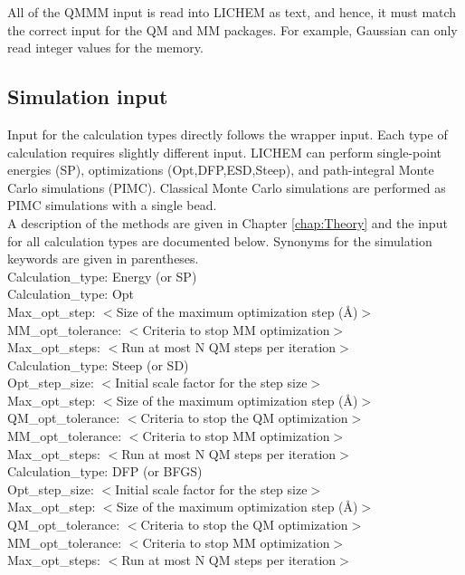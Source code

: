 \documentclass[12pt]{report}
\begin{document}
All of the QMMM input is read into LICHEM as text, and hence, it must match the
correct input for the QM and MM packages. For example, Gaussian can only read
integer values for the memory.

\subsection{Simulation input}

Input for the calculation types directly follows the wrapper input. Each type
of calculation requires slightly different input. LICHEM can perform
single-point energies (SP), optimizations (Opt,DFP,ESD,Steep), and
path-integral Monte Carlo simulations (PIMC). Classical Monte Carlo
simulations are performed as PIMC simulations with a single bead. \\

A description of the methods are given in Chapter \ref{chap:Theory} and the
input for all calculation types are documented below. Synonyms for the
simulation keywords are given in parentheses. \\

Calculation\_type: Energy (or SP) \\

Calculation\_type: Opt \\
Max\_opt\_step: $<$Size of the maximum optimization step (\AA)$>$ \\
MM\_opt\_tolerance: $<$Criteria to stop MM optimization$>$ \\
Max\_opt\_steps: $<$Run at most N QM steps per iteration$>$ \\

Calculation\_type: Steep (or SD) \\
Opt\_step\_size: $<$Initial scale factor for the step size$>$ \\
Max\_opt\_step: $<$Size of the maximum optimization step (\AA)$>$
QM\_opt\_tolerance: $<$Criteria to stop the QM optimization$>$\\
MM\_opt\_tolerance: $<$Criteria to stop MM optimization$>$ \\
Max\_opt\_steps: $<$Run at most N QM steps per iteration$>$ \\

Calculation\_type: DFP (or BFGS) \\
Opt\_step\_size: $<$Initial scale factor for the step size$>$ \\
Max\_opt\_step: $<$Size of the maximum optimization step (\AA)$>$
QM\_opt\_tolerance: $<$Criteria to stop the QM optimization$>$\\
MM\_opt\_tolerance: $<$Criteria to stop MM optimization$>$ \\
Max\_opt\_steps: $<$Run at most N QM steps per iteration$>$ \\
\end{document}
